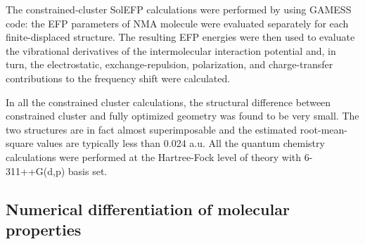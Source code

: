 \documentclass[a4paper,titlepage,twoside,fleqn,12pt]{book}
\begin{document}
\begin{appendices}
\begin{refsection}
The constrained\hyp{}cluster SolEFP calculations
were performed by using GAMESS code: the EFP parameters
of NMA molecule were evaluated separately for
each finite\hyp{}displaced structure. The resulting EFP energies were then used
to evaluate the vibrational derivatives of the intermolecular
interaction potential and, in turn, the electrostatic, exchange\hyp{}repulsion,
polarization, and charge\hyp{}transfer contributions to
the frequency shift were calculated.

In all the constrained cluster calculations, the
structural difference between constrained cluster and fully
optimized geometry was found to be very small. The two
structures are in fact almost superimposable and the estimated
root\hyp{}mean\hyp{}square values are typically less than 0.024
a.u. All the quantum chemistry calculations were performed
at the Hartree\hyp{}Fock level of theory with 6-311++G(d,p) basis
set.%

\subsection{Numerical differentiation of molecular properties}


\end{refsection}
\end{appendices}
\end{document}
